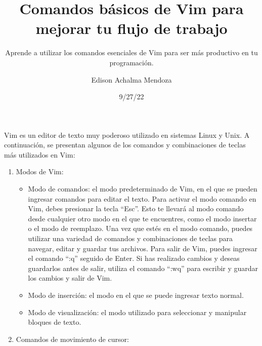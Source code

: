 \documentclass[
  a4paper,
]{article}
\title{Comandos básicos de Vim para mejorar tu flujo de trabajo}
\subtitle{Aprende a utilizar los comandos esenciales de Vim para ser más
productivo en tu programación.}
\author{Edison Achalma Mendoza}
\date{9/27/22}
\renewcommand*\contentsname{Table of contents}
\newcommand\contentsname{Table of contents}
\begin{document}
\maketitle
\ifdefined\Shaded\renewenvironment{Shaded}{\begin{tcolorbox}[enhanced, frame hidden, interior hidden, breakable, borderline west={3pt}{0pt}{shadecolor}, boxrule=0pt, sharp corners]}{\end{tcolorbox}}\fi

\renewcommand*\contentsname{Contenidos}
{
\hypersetup{linkcolor=}
\setcounter{tocdepth}{3}
\tableofcontents
}
\listoffigures
\listoftables
Vim es un editor de texto muy poderoso utilizado en sistemas Linux y
Unix. A continuación, se presentan algunos de los comandos y
combinaciones de teclas más utilizados en Vim:

\begin{enumerate}
\def\labelenumi{\arabic{enumi}.}
\item
  Modos de Vim:

  \begin{itemize}
  \item
    Modo de comandos: el modo predeterminado de Vim, en el que se pueden
    ingresar comandos para editar el texto. Para activar el modo comando
    en Vim, debes presionar la tecla ``Esc''. Esto te llevará al modo
    comando desde cualquier otro modo en el que te encuentres, como el
    modo insertar o el modo de reemplazo. Una vez que estés en el modo
    comando, puedes utilizar una variedad de comandos y combinaciones de
    teclas para navegar, editar y guardar tus archivos. Para salir de
    Vim, puedes ingresar el comando ``:q'' seguido de Enter. Si has
    realizado cambios y deseas guardarlos antes de salir, utiliza el
    comando ``:wq'' para escribir y guardar los cambios y salir de Vim.
  \item
    Modo de inserción: el modo en el que se puede ingresar texto normal.
  \item
    Modo de visualización: el modo utilizado para seleccionar y
    manipular bloques de texto.
  \end{itemize}
\item
  Comandos de movimiento de cursor:


\end{enumerate}
\end{document}
